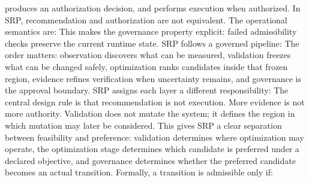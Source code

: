 {}produces an authorization decision, and\markdownRendererInterblockSeparator
{}\markdownRendererInterblockSeparator
{}performs execution when authorized. In SRP, recommendation and authorization are not equivalent. The operational semantics are:\markdownRendererInterblockSeparator
{}\markdownRendererInterblockSeparator
{}This makes the governance property explicit: failed admissibility checks preserve the current runtime state.\markdownRendererInterblockSeparator
{}
\markdownRendererSectionEnd \markdownRendererSectionBegin
{}\markdownRendererInterblockSeparator
{}SRP follows a governed pipeline:\markdownRendererInterblockSeparator
{}\markdownRendererInterblockSeparator
{}The order matters: observation discovers what can be measured, validation freezes what can be changed safely, optimization ranks candidates inside that frozen region, evidence refines verification when uncertainty remains, and governance is the approval boundary.\markdownRendererInterblockSeparator
{}
\markdownRendererSectionEnd \markdownRendererSectionBegin
{}\markdownRendererInterblockSeparator
{}SRP assigns each layer a different responsibility:\markdownRendererInterblockSeparator
{}\markdownRendererInterblockSeparator
{}The central design rule is that recommendation is not execution. More evidence is not more authority. Validation does not mutate the system; it defines the region in which mutation may later be considered.\markdownRendererParagraphSeparator
{}This gives SRP a clear separation between feasibility and preference: validation determines where optimization may operate, the optimization stage determines which candidate is preferred under a declared objective, and governance determines whether the preferred candidate becomes an actual transition.\markdownRendererParagraphSeparator
{}Formally, a transition is admissible only if:\markdownRendererInterblockSeparator
{}\markdownRendererInterblockSeparator

